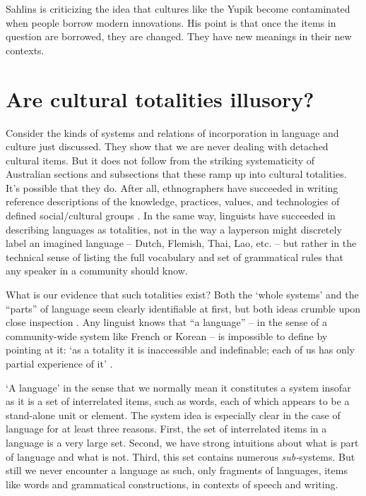 Sahlins is criticizing the idea that cultures like the Yupik 
become contaminated when people borrow modern innovations. His point is that once the items in question are borrowed, they are changed. They have new meanings in their new contexts. 



\section{Are cultural totalities illusory?}

Consider the kinds of systems and relations of incorporation in language and 
culture just discussed. They show that we are never dealing with 
detached cultural items. But it does not follow from the striking 
systematicity of Australian sections and subsections that 
these ramp up into cultural totalities. It's possible that they do. After all, ethnographers have 
succeeded in writing reference descriptions of the knowledge, practices, 
values, and technologies of defined social/cultural groups  \citep{radcliffe-brown_andaman_1922,bronislaw_malinowski_argonauts_1922,firth_we_1936,evans-pritchard_nuer:_1940,fortes_dynamics_1945}. In the same way, linguists have succeeded in describing languages as 
totalities, not in the way a layperson might discretely label an 
imagined language -- Dutch, Flemish, Thai, Lao, etc. -- but rather in the technical sense of listing the full vocabulary and set of 
grammatical rules that any speaker in a community should know. 



What is our evidence that such totalities exist? Both the \textquoteleft whole 
systems' and the ``parts'' of language seem clearly identifiable at first, but both ideas crumble upon close inspection \citep{le_page_acts_1985,hudson_sociolinguistics_1996}. Any linguist knows that 
``a language'' -- in the sense of a community-wide system like French or 
Korean -- is impossible to define by pointing at 
it: \textquoteleft as a totality it is inaccessible and indefinable; each of us has 
only partial experience of it' \citep[191]{le_page_acts_1985}. 



`A language' in the sense that we normally mean it constitutes a system 
insofar as it is a set of interrelated items, such as words, each of 
which appears to be a stand-alone unit or element. The system idea is 
especially clear in the case of language for at least three reasons. First, the set of 
interrelated items in a language is a very large set. Second, we have 
strong intuitions about what is part of language and what is not. Third, this set contains numerous \textit{sub-}systems. 
But still we never encounter a language as such, only fragments of 
languages, items like words and grammatical constructions, in contexts of speech and writing. 



